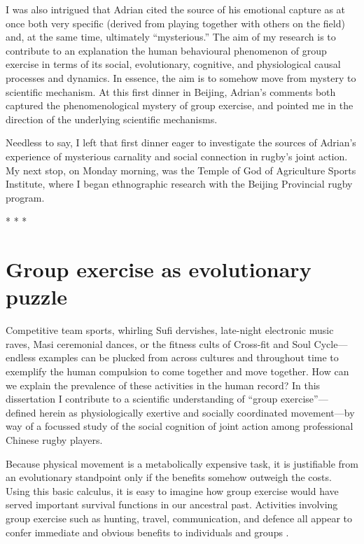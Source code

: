 \begin{CJK}{UTF8}{gbsn}
I was also intrigued that Adrian cited the source of his emotional capture as at once both very specific (derived from playing together with others on the field) and, at the same time, ultimately ``mysterious.''  The aim of my research is to contribute to an explanation the human behavioural phenomenon of group exercise in terms of its social, evolutionary, cognitive, and physiological causal processes and dynamics.  In essence, the aim is to somehow move from mystery to scientific mechanism.  At this first dinner in Beijing, Adrian's comments both captured the phenomenological mystery of group exercise, and pointed me in the direction of the underlying scientific mechanisms.

Needless to say, I left that first dinner eager to investigate the sources of Adrian's experience of mysterious carnality and social connection in rugby's joint action.  My next stop, on Monday morning, was the Temple of God of Agriculture Sports Institute, where I began ethnographic research with the Beijing Provincial rugby program.


                            \begin{center}
                              * * *
                            \end{center}





\section{Group exercise as evolutionary puzzle}
Competitive team sports, whirling Sufi dervishes, late-night electronic music raves, Masi ceremonial dances, or the fitness cults of Cross-fit and Soul Cycle---endless examples can be plucked from across cultures and throughout time to exemplify the human compulsion to come together and move together.  How can we explain the prevalence of these activities in the human record?  In this dissertation I contribute to a scientific understanding of ``group exercise''---defined herein as physiologically exertive and socially coordinated movement---by way of a focussed study of the social cognition of joint action among professional Chinese rugby players.

Because physical movement is a metabolically expensive task, it is justifiable from an evolutionary standpoint only if the benefits somehow outweigh the costs.  Using this basic calculus, it is easy to imagine how group exercise would have served important survival functions in our ancestral past.  Activities involving group exercise such as hunting, travel, communication, and defence all appear to confer immediate and obvious benefits to individuals and groups \citep{Sands2010}.


\end{CJK}
